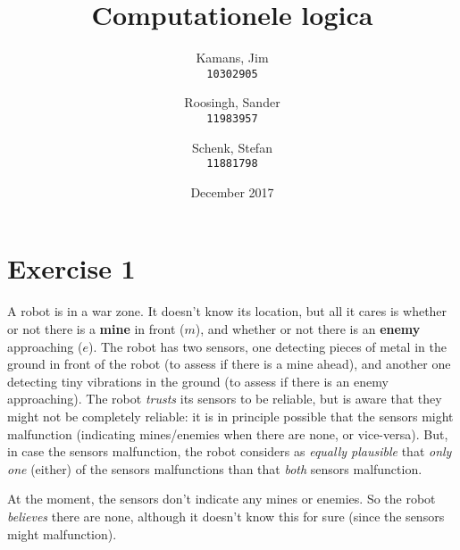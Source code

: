 \documentclass[leqno]{article}
\title{Computationele logica}
\author{
    Kamans, Jim\\
    \texttt{10302905}
    \and
    Roosingh, Sander\\
    \texttt{11983957}
    \and
    Schenk, Stefan\\
    \texttt{11881798}
}
\date{December 2017}
\begin{document}
\maketitle

\section*{Exercise 1}
A robot is in a war zone. 
It doesn't know its location, but all it cares is whether or not there is a 
\textbf{mine} in front ($m$), and whether or not there is an \textbf{enemy} 
approaching ($e$).
The robot has two sensors, one detecting pieces of metal in the ground in 
front of the robot (to assess if there is a mine ahead), and another one 
detecting tiny vibrations in the ground (to assess if there is an enemy 
approaching). 
The robot \textit{trusts} its sensors to be reliable, but is aware that they 
might not be completely reliable: it is in principle possible that the sensors 
might malfunction (indicating mines/enemies when there are none, or vice-versa). 
But, in case the sensors malfunction, the robot considers as \textit{equally 
plausible} that \textit{only one} (either) of the sensors malfunctions than 
that \textit{both} sensors malfunction.

At the moment, the sensors don't indicate any mines or enemies. 
So the robot \textit{believes} there are none, although it doesn't know this 
for sure (since the sensors might malfunction).
\end{document}
